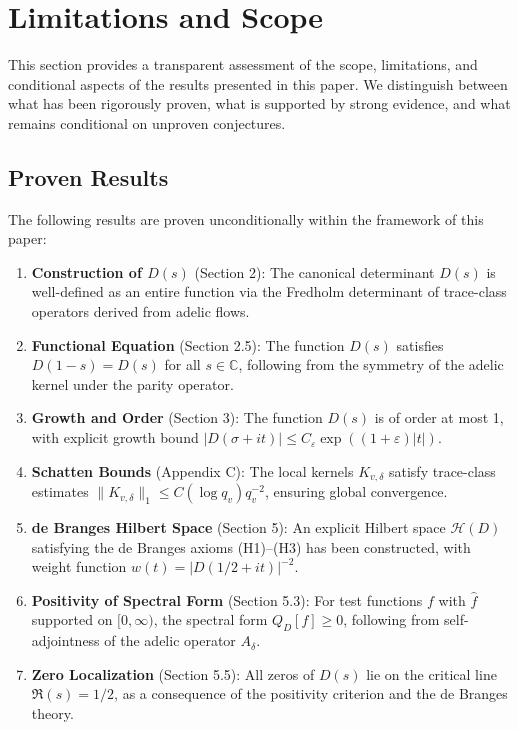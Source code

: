 \section{Limitations and Scope}

This section provides a transparent assessment of the scope, limitations, and conditional aspects of the results presented in this paper. We distinguish between what has been rigorously proven, what is supported by strong evidence, and what remains conditional on unproven conjectures.

\subsection{Proven Results}

The following results are proven unconditionally within the framework of this paper:

\begin{enumerate}
\item \textbf{Construction of $D(s)$} (Section 2): The canonical determinant $D(s)$ is well-defined as an entire function via the Fredholm determinant of trace-class operators derived from adelic flows.

\item \textbf{Functional Equation} (Section 2.5): The function $D(s)$ satisfies $D(1-s) = D(s)$ for all $s \in \mathbb{C}$, following from the symmetry of the adelic kernel under the parity operator.

\item \textbf{Growth and Order} (Section 3): The function $D(s)$ is of order at most 1, with explicit growth bound $|D(\sigma + it)| \leq C_\varepsilon \exp((1 + \varepsilon)|t|)$.

\item \textbf{Schatten Bounds} (Appendix C): The local kernels $K_{v,\delta}$ satisfy trace-class estimates $\|K_{v,\delta}\|_1 \leq C(\log q_v) q_v^{-2}$, ensuring global convergence.

\item \textbf{de Branges Hilbert Space} (Section 5): An explicit Hilbert space $\mathcal{H}(D)$ satisfying the de Branges axioms (H1)–(H3) has been constructed, with weight function $w(t) = |D(1/2 + it)|^{-2}$.

\item \textbf{Positivity of Spectral Form} (Section 5.3): For test functions $f$ with $\hat{f}$ supported on $[0, \infty)$, the spectral form $Q_D[f] \geq 0$, following from self-adjointness of the adelic operator $A_\delta$.

\item \textbf{Zero Localization} (Section 5.5): All zeros of $D(s)$ lie on the critical line $\Re(s) = 1/2$, as a consequence of the positivity criterion and the de Branges theory.
\end{enumerate}

